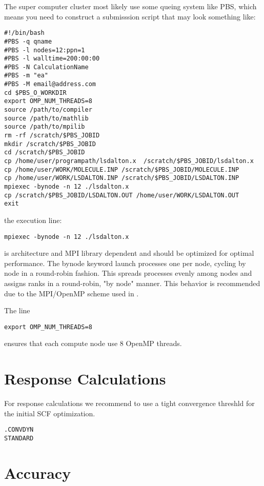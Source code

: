 The super computer cluster most likely use some queing system like PBS, which means you need to construct a submisssion script that may look something like:

\begin{verbatim}
#!/bin/bash                                                                     
#PBS -q qname
#PBS -l nodes=12:ppn=1
#PBS -l walltime=200:00:00                                                      
#PBS -N CalculationName
#PBS -m "ea"                                                                    
#PBS -M email@address.com
cd $PBS_O_WORKDIR
export OMP_NUM_THREADS=8
source /path/to/compiler
source /path/to/mathlib
source /path/to/mpilib
rm -rf /scratch/$PBS_JOBID
mkdir /scratch/$PBS_JOBID
cd /scratch/$PBS_JOBID
cp /home/user/programpath/lsdalton.x  /scratch/$PBS_JOBID/lsdalton.x
cp /home/user/WORK/MOLECULE.INP /scratch/$PBS_JOBID/MOLECULE.INP
cp /home/user/WORK/LSDALTON.INP /scratch/$PBS_JOBID/LSDALTON.INP
mpiexec -bynode -n 12 ./lsdalton.x
cp /scratch/$PBS_JOBID/LSDALTON.OUT /home/user/WORK/LSDALTON.OUT
exit
\end{verbatim}

the execution line: 
\begin{verbatim}
mpiexec -bynode -n 12 ./lsdalton.x
\end{verbatim}
is architecture and MPI library dependent and should be optimized for optimal performance. 
The bynode keyword launch processes one per node, cycling by node in a round-robin fashion. This spreads processes evenly among nodes and assigns ranks in a round-robin, "by node" manner. This behavior is recommended due to the MPI/OpenMP scheme used in {\lsdalton}.

The line
\begin{verbatim}
export OMP_NUM_THREADS=8
\end{verbatim}
ensures that each compute node use 8 OpenMP threads. 

\section{Response Calculations}

For response calculations we recommend to use a tight convergence threshld for the initial SCF optimization. 

\begin{verbatim}
.CONVDYN
STANDARD
\end{verbatim}

\section{Accuracy}

